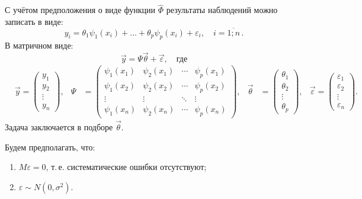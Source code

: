 С учётом предположения о виде функции $\widehat{\Phi}$ результаты наблюдений можно записать в виде:
\begin{equation}
    y_i = \theta_1 \psi_1(x_i) + \dots + \theta_p \psi_p(x_i) + \varepsilon_i, \quad i = \overline{1; n}\,.
\end{equation}
В матричном виде:
\begin{equation}
    \vec{y} = \Psi \vec{\theta} + \vec{\varepsilon}, \quad \text{где}
\end{equation}
\begin{align*}
    & \vec{y} = \begin{pmatrix} 
        y_1    \\ 
        y_2    \\ 
        \vdots \\ 
        y_n 
    \end{pmatrix},
    & \Psi &= \begin{pmatrix}
        \psi_1(x_1) & \psi_2(x_1) & \cdots & \psi_p(x_1) \\
        \psi_1(x_2) & \psi_2(x_2) & \cdots & \psi_p(x_2) \\
        \vdots      & \vdots      & \ddots & \vdots      \\
        \psi_1(x_n) & \psi_2(x_n) & \cdots & \psi_p(x_n)
    \end{pmatrix},
    & \vec{\theta} &= \begin{pmatrix}
        \theta_1 \\
        \theta_2 \\ 
        \vdots   \\ 
        \theta_p
    \end{pmatrix},
    & \vec{\varepsilon} = \begin{pmatrix} 
        \varepsilon_1 \\
        \varepsilon_2 \\ 
        \vdots        \\ 
        \varepsilon_n
    \end{pmatrix}.
\end{align*} 
Задача заключается в подборе $\vec{\theta}$.

Будем предполагать, что:
\begin{enumerate}
    \item $M\varepsilon = 0$, т.\,е. систематические ошибки отсутствуют;
    \item $\varepsilon \sim N(0, \sigma^2)$.
\end{enumerate}
        
